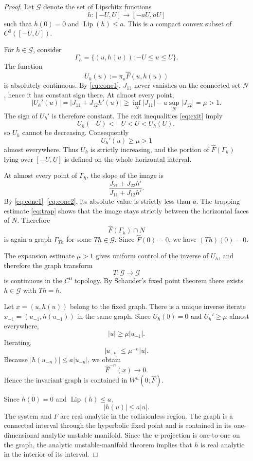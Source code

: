 \documentclass[11pt]{article}
\newcommand{\Wu}{W^{u}}
\begin{document}
\begin{proof}
Let $\mathcal G$ denote the set of Lipschitz functions
\[
 h:[-U,U]\longrightarrow[-aU,aU]
\]
such that $h(0)=0$ and $\operatorname{Lip}(h)\le a$.
This is a compact convex subset of $C^0([-U,U])$.

For $h\in\mathcal G$, consider
\[
 \Gamma_h=\{(u,h(u)):-U\le u\le U\}.
\]
The function
\[
 U_h(u):=\pi_u\widehat F(u,h(u))
\]
is absolutely continuous.  By \eqref{eq:cone1}, $J_{11}$ never vanishes on
the connected set $N$, hence it has constant sign there.  At almost every
point,
\[
 |U_h'(u)|
 =
 |J_{11}+J_{12}h'(u)|
 \ge
 \inf_N|J_{11}|-a\sup_N|J_{12}|
 =
 \mu>1.
\]
The sign of $U_h'$ is therefore constant.  The exit inequalities
\eqref{eq:exit} imply
\[
 U_h(-U)<-U<U<U_h(U),
\]
so $U_h$ cannot be decreasing.  Consequently
\[
 U_h'(u)\ge\mu>1
\]
almost everywhere.  Thus $U_h$ is strictly increasing, and the portion of
$\widehat F(\Gamma_h)$ lying over $[-U,U]$ is defined on the whole
horizontal interval.

At almost every point of $\Gamma_h$, the slope of the image is
\[
 \frac{J_{21}+J_{22}h'}
 {J_{11}+J_{12}h'}.
\]
By \eqref{eq:cone1}--\eqref{eq:cone2}, its absolute value is strictly less
than $a$.  The trapping estimate \eqref{eq:trap} shows that the image stays
strictly between the horizontal faces of $N$.  Therefore
\[
 \widehat F(\Gamma_h)\cap N
\]
is again a graph $\Gamma_{Th}$ for some $Th\in\mathcal G$.
Since $\widehat F(0)=0$, we have $(Th)(0)=0$.

The expansion estimate $\mu>1$ gives uniform control of the inverse of
$U_h$, and therefore the graph transform
\[
 T:\mathcal G\longrightarrow\mathcal G
\]
is continuous in the $C^0$ topology.  By Schauder's fixed point theorem
there exists $h\in\mathcal G$ with $Th=h$.

Let $x=(u,h(u))$ belong to the fixed graph.  There is a unique inverse
iterate $x_{-1}=(u_{-1},h(u_{-1}))$ in the same graph.  Since
$U_h(0)=0$ and $U_h'\ge\mu$ almost everywhere,
\[
 |u|\ge\mu|u_{-1}|.
\]
Iterating,
\[
 |u_{-n}|\le\mu^{-n}|u|.
\]
Because $|h(u_{-n})|\le a|u_{-n}|$, we obtain
\[
 \widehat F^{-n}(x)\longrightarrow0.
\]
Hence the invariant graph is contained in $\Wu(0;\widehat F)$.

Since $h(0)=0$ and $\operatorname{Lip}(h)\le a$,
\[
 |h(u)|\le a|u|.
\]
The system and $F$ are real analytic in the collisionless region.
The graph is a connected interval through the hyperbolic fixed point and is
contained in its one-dimensional analytic unstable manifold.  Since the
$u$-projection is one-to-one on the graph, the analytic unstable-manifold
theorem implies that $h$ is real analytic in the interior of its interval.
\end{proof}
\end{document}
